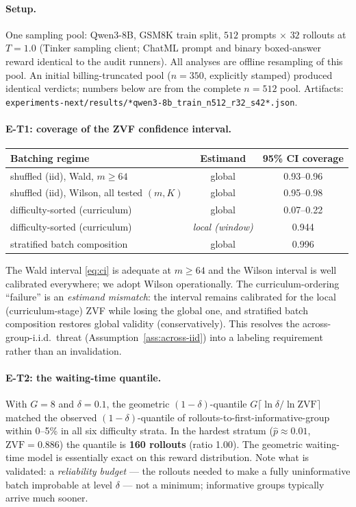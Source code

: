 \documentclass[11pt]{article}
\theoremstyle{plain}
\theoremstyle{definition}
\theoremstyle{remark}
\newcommand{\1}{\mathbb{1}}
\begin{document}
\paragraph{Setup.} One sampling pool: Qwen3-8B, GSM8K train split,
$512$ prompts $\times$ $32$ rollouts at $T{=}1.0$ (Tinker sampling client;
ChatML prompt and binary boxed-answer reward identical to the audit
runners). All analyses are offline resampling of this pool. An initial
billing-truncated pool ($n{=}350$, explicitly stamped) produced identical
verdicts; numbers below are from the complete $n{=}512$ pool. Artifacts:
\texttt{experiments-next/results/*qwen3-8b\_train\_n512\_r32\_s42*.json}.

\paragraph{E-T1: coverage of the ZVF confidence interval.}
\begin{center}
\begin{tabular}{@{}lcc@{}}
\toprule
Batching regime & Estimand & 95\% CI coverage \\
\midrule
shuffled (iid), Wald, $m\ge 64$ & global & 0.93--0.96 \\
shuffled (iid), Wilson, all tested $(m,K)$ & global & 0.95--0.98 \\
difficulty-sorted (curriculum) & global & 0.07--0.22 \\
difficulty-sorted (curriculum) & \emph{local (window)} & 0.944 \\
stratified batch composition & global & 0.996 \\
\bottomrule
\end{tabular}
\end{center}
The Wald interval \eqref{eq:ci} is adequate at $m\ge 64$ and the Wilson
interval is well calibrated everywhere; we adopt Wilson operationally.
The curriculum-ordering ``failure'' is an \emph{estimand mismatch}: the
interval remains calibrated for the local (curriculum-stage) ZVF while
losing the global one, and stratified batch composition restores global
validity (conservatively). This resolves the across-group-i.i.d.\ threat
(Assumption~\ref{ass:across-iid}) into a labeling requirement rather than
an invalidation.

\paragraph{E-T2: the waiting-time quantile.} With $G{=}8$ and
$\delta{=}0.1$, the geometric $(1{-}\delta)$-quantile
$G\lceil\ln\delta/\ln\mathrm{ZVF}\rceil$ matched the observed
$(1{-}\delta)$-quantile of rollouts-to-first-informative-group within
0--5\% in all six difficulty strata. In the hardest stratum
($\hat p\approx 0.01$, $\mathrm{ZVF}=0.886$) the quantile is
\textbf{160 rollouts} (ratio 1.00). The geometric waiting-time model is
essentially exact on this reward distribution. Note what is validated:
a \emph{reliability budget} --- the rollouts needed to make a fully
uninformative batch improbable at level $\delta$ --- not a minimum;
informative groups typically arrive much sooner.
\end{document}
